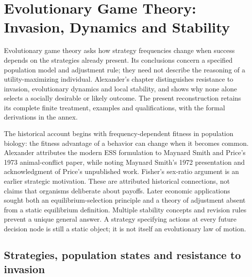 \chapter{Evolutionary Game Theory: Invasion, Dynamics and Stability}
\label{sec:p17-rat93-evolutionary-games}

Evolutionary game theory asks how strategy frequencies change when
success depends on the strategies already present. Its conclusions concern
a specified population model and adjustment rule; they need not describe
the reasoning of a utility-maximizing individual. Alexander's chapter
distinguishes resistance to invasion, evolutionary dynamics and local
stability, and shows why none alone selects a socially desirable or likely
outcome. The present reconstruction retains its complete finite treatment,
examples and qualifications, with the formal derivations in the annex.
\cite[chap.~9.3, pp.~553--564]{Alexander2021EvolutionaryGames}

The historical account begins with frequency-dependent fitness in population
biology: the fitness advantage of a behavior can change when it becomes
common. Alexander attributes the modern ESS formulation to Maynard Smith
and Price's 1973 animal-conflict paper, while noting Maynard Smith's 1972
presentation and acknowledgment of Price's unpublished work. Fisher's
sex-ratio argument is an earlier strategic motivation. These are attributed
historical connections, not claims that organisms deliberate about payoffs.
Later economic applications sought both an equilibrium-selection principle
and a theory of adjustment absent from a static equilibrium definition.
Multiple stability concepts and revision rules prevent a unique general
answer. A strategy specifying actions at every future decision node is
still a static object; it is not itself an evolutionary law of motion.
\cite[Sec.~1 and notes~1--2, pp.~553--554, 564]{Alexander2021EvolutionaryGames}

\section{Strategies, population states and resistance to invasion}
\label{sec:p17-rat93-static}

